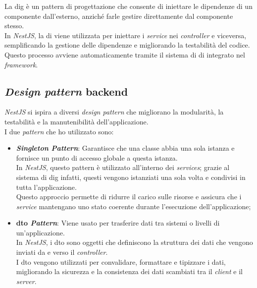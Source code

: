\noindent La \gls{dig} è un pattern di progettazione che consente di iniettare le dipendenze di un componente dall'esterno, anziché farle gestire direttamente dal componente stesso. \\
In \textit{NestJS}, la \gls{di} viene utilizzata per iniettare i \textit{service} nei \textit{controller} e viceversa, semplificando la gestione delle dipendenze e migliorando la testabilità del codice. \\
Questo processo avviene automaticamente tramite il sistema di \gls{di} integrato nel \textit{framework}.

\subsection*{\textit{Design pattern} backend}

\textit{NestJS} si ispira a diversi \textit{design pattern} che migliorano la modularità, la testabilità e la manutenibilità dell'applicazione.\\

\noindent I due \textit{pattern} che ho utilizzato sono:
\begin{itemize}
    \item \textbf{\textit{Singleton Pattern}}: Garantisce che una classe abbia una sola istanza e fornisce un punto di accesso globale a questa istanza.\\
    In \textit{NestJS}, questo pattern è utilizzato all'interno dei \textit{services};
    grazie al sistema di \gls{dig} infatti, questi vengono istanziati una sola volta e condivisi in tutta l'applicazione.\\
    Questo approccio permette di ridurre il carico sulle risorse e assicura che i \textit{service} mantengano uno stato coerente durante l'esecuzione dell'applicazione;
    \item \textbf{\gls{dto} \textit{Pattern}}: Viene usato per trasferire dati tra sistemi o livelli di un'applicazione.\\
    In \textit{NestJS}, i \gls{dto} sono oggetti che definiscono la struttura dei dati che vengono inviati da e verso il \textit{controller}.\\
    I \gls{dto} vengono utilizzati per convalidare, formattare e tipizzare i dati, migliorando la sicurezza e la consistenza dei dati scambiati tra il \textit{client} e il \textit{server}. \\   
\end{itemize}
